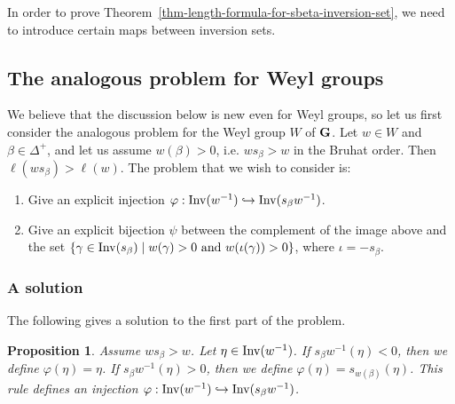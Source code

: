 \documentclass[10pt]{amsart}
\newtheorem{prop}[theo]{Proposition}
\begin{document}
In order to prove Theorem~\ref{thm-length-formula-for-sbeta-inversion-set}, we need to introduce certain maps between inversion sets.

\subsection{The analogous problem for Weyl groups}

We believe that the discussion below is new even for Weyl groups, so let us first consider the analogous problem for the Weyl group $W$ of $\mathbf{G}$. Let $w \in W$ and $\beta\in\Delta^+$, and let us assume $w(\beta) > 0$, i.e. $w s_\beta > w$ in the Bruhat order. Then $\ell(ws_\beta) > \ell(w)$. The problem that we wish to consider is:
\begin{enumerate}
\item Give an explicit injection $\varphi:\operatorname{Inv}(w^{-1}) \hookrightarrow \operatorname{Inv}(s_\beta w^{-1})$.
\item Give an explicit bijection $\psi$ between the complement of the image above and the set $\{\gamma \in \operatorname{Inv}(s_\beta) \mid w(\gamma) > 0 \text{ and } w(\iota(\gamma)) > 0 \}$, where $\iota = -s_\beta$.
\end{enumerate}

\subsubsection{A solution}

The following gives a solution to the first part of the problem.
\begin{prop}\label{prop-phi-is-injection}
Assume $w s_\beta > w$. Let $\eta \in \operatorname{Inv}(w^{-1})$. If $s_\beta w^{-1}(\eta) < 0$, then we define $\varphi(\eta) = \eta$. If $s_\beta w^{-1}(\eta) > 0$, then we define $\varphi(\eta) = s_{w(\beta)}(\eta)$. This rule defines an injection $\varphi: \operatorname{Inv}(w^{-1}) \hookrightarrow \operatorname{Inv}(s_\beta w^{-1})$.
\end{prop}
\end{document}
